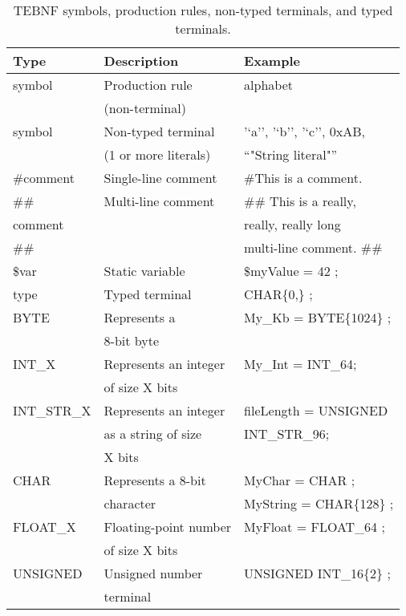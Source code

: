 \begin{table}[h!]
\begin{center}
\caption{TEBNF symbols, production rules, non-typed terminals, and typed terminals.}
\label{TEBNFSymbols}
\begin{tabular}{|l|l|l|} \hline
\textbf{Type} & \textbf{Description} & \textbf{Example} \\ \hline \hline
symbol & Production rule  & alphabet \\
       &(non-terminal)    &          \\ \hline
symbol & Non-typed terminal   & '‘a'’, '‘b’', '‘c'’, 0xAB, \\
       & (1 or more literals) & “"String literal"”     \\ \hline                    
\#comment & Single-line comment & \#This is a comment. \\ \hline
\#\#      & Multi-line comment & \#\# This is a really,   \\
comment &                    & really, really long    \\
\#\#      &                    & multi-line comment. \#\# \\ \hline
\$var & Static variable & \$myValue = 42 ; \\ \hline
type & Typed terminal & CHAR\{0,\} ; \\ \hline
BYTE & Represents a & My\_Kb = BYTE\{1024\} ; \\
     & 8-bit byte	&                       \\ \hline
INT\_X      & Represents an integer & My\_Int = INT\_64; \\
            & of size X bits        &                  \\ \hline
INT\_STR\_X & Represents an integer & fileLength = UNSIGNED \\
            & as a string of size   & INT\_STR\_96;         \\           
            & X bits                &                       \\ \hline
CHAR        & Represents a 8-bit    & MyChar = CHAR ;        \\
            & character             & MyString = CHAR\{128\} ; \\ \hline
FLOAT\_X    & Floating-point number & MyFloat = FLOAT\_64 ; \\
            & of size X bits        &                      \\ \hline
UNSIGNED    & Unsigned number & UNSIGNED INT\_16\{2\} ; \\
            & terminal        &                      \\ \hline
\end{tabular}
\end{center}
\end{table}

